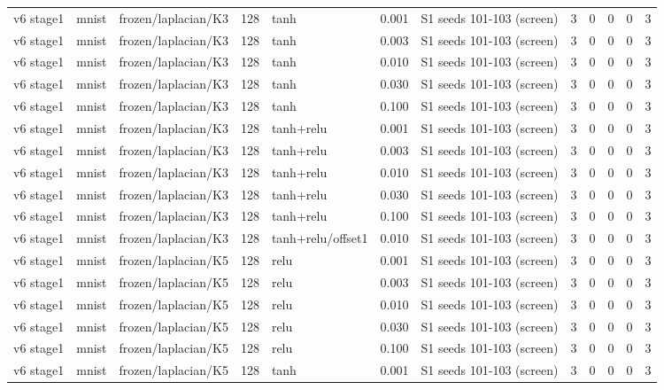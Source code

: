 \begin{table}[htbp]
{\begin{tabular}{@{}lllrlrlrrrrr@{}}
v6 stage1 & mnist & frozen/laplacian/K3 & 128 & tanh & 0.001 & S1 seeds 101-103 (screen) & 3 & 0 & 0 & 0 & 3 \\
v6 stage1 & mnist & frozen/laplacian/K3 & 128 & tanh & 0.003 & S1 seeds 101-103 (screen) & 3 & 0 & 0 & 0 & 3 \\
v6 stage1 & mnist & frozen/laplacian/K3 & 128 & tanh & 0.010 & S1 seeds 101-103 (screen) & 3 & 0 & 0 & 0 & 3 \\
v6 stage1 & mnist & frozen/laplacian/K3 & 128 & tanh & 0.030 & S1 seeds 101-103 (screen) & 3 & 0 & 0 & 0 & 3 \\
v6 stage1 & mnist & frozen/laplacian/K3 & 128 & tanh & 0.100 & S1 seeds 101-103 (screen) & 3 & 0 & 0 & 0 & 3 \\
v6 stage1 & mnist & frozen/laplacian/K3 & 128 & tanh+relu & 0.001 & S1 seeds 101-103 (screen) & 3 & 0 & 0 & 0 & 3 \\
v6 stage1 & mnist & frozen/laplacian/K3 & 128 & tanh+relu & 0.003 & S1 seeds 101-103 (screen) & 3 & 0 & 0 & 0 & 3 \\
v6 stage1 & mnist & frozen/laplacian/K3 & 128 & tanh+relu & 0.010 & S1 seeds 101-103 (screen) & 3 & 0 & 0 & 0 & 3 \\
v6 stage1 & mnist & frozen/laplacian/K3 & 128 & tanh+relu & 0.030 & S1 seeds 101-103 (screen) & 3 & 0 & 0 & 0 & 3 \\
v6 stage1 & mnist & frozen/laplacian/K3 & 128 & tanh+relu & 0.100 & S1 seeds 101-103 (screen) & 3 & 0 & 0 & 0 & 3 \\
v6 stage1 & mnist & frozen/laplacian/K3 & 128 & tanh+relu/offset1 & 0.010 & S1 seeds 101-103 (screen) & 3 & 0 & 0 & 0 & 3 \\
v6 stage1 & mnist & frozen/laplacian/K5 & 128 & relu & 0.001 & S1 seeds 101-103 (screen) & 3 & 0 & 0 & 0 & 3 \\
v6 stage1 & mnist & frozen/laplacian/K5 & 128 & relu & 0.003 & S1 seeds 101-103 (screen) & 3 & 0 & 0 & 0 & 3 \\
v6 stage1 & mnist & frozen/laplacian/K5 & 128 & relu & 0.010 & S1 seeds 101-103 (screen) & 3 & 0 & 0 & 0 & 3 \\
v6 stage1 & mnist & frozen/laplacian/K5 & 128 & relu & 0.030 & S1 seeds 101-103 (screen) & 3 & 0 & 0 & 0 & 3 \\
v6 stage1 & mnist & frozen/laplacian/K5 & 128 & relu & 0.100 & S1 seeds 101-103 (screen) & 3 & 0 & 0 & 0 & 3 \\
v6 stage1 & mnist & frozen/laplacian/K5 & 128 & tanh & 0.001 & S1 seeds 101-103 (screen) & 3 & 0 & 0 & 0 & 3 \\

\end{tabular}}
\end{table}
